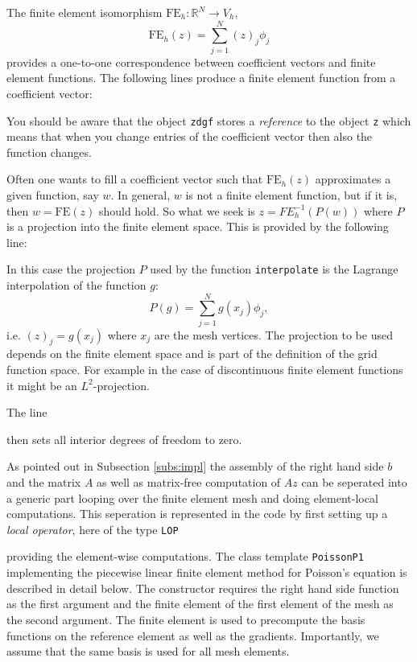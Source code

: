 \documentclass[a4paper,12pt]{article}
\begin{document}
The finite element isomorphism $\text{FE}_h : \mathbb{R}^N \to V_h$,
$$\text{FE}_h(z) = \sum_{j=1}^N (z)_j \phi_j$$ provides
a one-to-one correspondence between coefficient vectors and
finite element functions. The following lines produce
a finite element function from a coefficient vector:

You should be aware that the object \lstinline{zdgf} stores a {\em reference}
to the object \lstinline{z} which means that when you change entries of the
coefficient vector then also the function changes.

Often one wants to fill a coefficient vector such that $\text{FE}_h(z)$ approximates
a given function, say $w$. In general, $w$ is not a finite element function, but if it
is, then $w=\text{FE}(z)$ should hold. So what we seek is $z=FE_h^{-1}(P(w))$ where $P$ is 
a projection into the finite element space. This is provided by the following line:

In this case the projection $P$ used by the function \lstinline{interpolate} is
the Lagrange interpolation of the function $g$: 
$$P(g) = \sum_{j=1}^N g(x_j) \phi_j,$$ i.e. $(z)_j = g(x_j)$ where $x_j$
are the mesh vertices.
The projection to  be used depends on the finite element space and is
part of the definition of the grid function space. For example in the case
of discontinuous finite element functions it might be an $L^2$-projection.

The line

then sets all interior degrees of freedom to zero.

As pointed out in Subsection \ref{subs:impl} the assembly of the 
right hand side $b$ and the matrix $A$ as well as matrix-free computation of $Az$
can be seperated into a generic part looping over the finite element mesh 
and doing element-local computations. This seperation is represented in the code 
by first setting up a {\em local operator}, here of the type \lstinline{LOP}

providing the element-wise computations.
The class template \lstinline{PoissonP1}
implementing the piecewise linear finite element method for Poisson's equation
is described in detail below. The constructor
requires the right hand side function as the first argument and the 
finite element of the first element
of the mesh as the second argument. The finite element is used to
precompute the basis functions on the reference element as well as the gradients.
Importantly, we assume that the same basis is used for all mesh elements.
\end{document}
